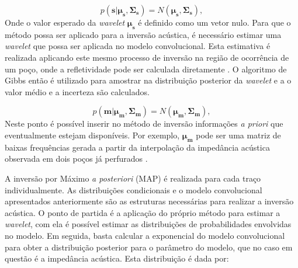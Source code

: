 \begin{equation}
\label{eq:pwavelet}
p(\boldsymbol{s}|\boldsymbol{\mu_{s}},\boldsymbol{\Sigma_{s}}) =
N(\boldsymbol{\mu_{s}},\boldsymbol{\Sigma_{s}}),
\end{equation} 
Onde o valor esperado da \textit{wavelet} $\boldsymbol{\mu_{s}}$ é definido
como um vetor nulo. Para que o método possa ser aplicado para a inversão
acústica, é necessário estimar uma \textit{wavelet} que possa ser aplicada
no modelo convolucional. Esta estimativa é realizada aplicando este mesmo processo
de inversão na região de ocorrência de um poço, onde a refletividade pode
ser calculada diretamente \citep{Figueiredo2014}. O algoritmo de
Gibbs então é utilizado para amostrar na distribuição posterior da \textit{wavelet} e a 
o valor médio e a incerteza são calculados.

\begin{equation}
\label{eq:pmodelo}
p(\boldsymbol{m}|\boldsymbol{\mu_{m}},\boldsymbol{\Sigma_{m}}) =
N(\boldsymbol{\mu_{m}},\boldsymbol{\Sigma_{m}}),
\end{equation} 
Neste ponto é possível inserir no método de inversão informações \textit{a priori}
que eventualmente estejam disponíveis. Por exemplo, $\boldsymbol{\mu_{m}}$ pode ser
uma matriz de baixas frequências gerada a partir da interpolação da impedância acústica observada em dois poços
já perfurados \citep{Figueiredo2014}.




% 

A inversão por Máximo \textit{a posteriori} (MAP)
\citep{Buland01012003,leandroGRSL} é realizada para cada traço individualmente.
As distribuições condicionais e o modelo convolucional apresentados anteriormente
são as estruturas necessárias para realizar a inversão acústica. O ponto de partida
é a aplicação do próprio método para estimar a \textit{wavelet},
com ela é possível estimar as distribuições de probabilidades envolvidas no modelo.
Em seguida, basta calcular a exponencial do modelo convolucional para obter a distribuição posterior
para o parâmetro do modelo, que no caso em questão é a impedância acústica. Esta distribuição é dada por:

